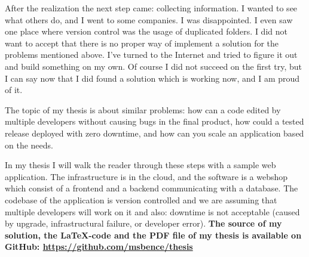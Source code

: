 After the realization the next step came: collecting information. I wanted to see what others do, and I went to some companies. I was disappointed. I even saw one place where version control was the usage of duplicated folders. I did not want to accept that there is no proper way of implement a solution for the problems mentioned above. I've turned to the Internet and tried to figure it out and build something on my own. Of course I did not succeed on the first try, but I can say now that I did found a solution which is working now, and I am proud of it.

The topic of my thesis is about similar problems: how can a code edited by multiple developers without causing bugs in the final product, how could a tested release deployed with zero downtime, and how can you scale an application based on the needs.

In my thesis I will walk the reader through these steps with a sample web application. The infrastructure is in the cloud, and the software is a webshop which consist of a frontend and a backend communicating with a database. The codebase of the application is version controlled and we are assuming that multiple developers will work on it and also: downtime is not acceptable (caused by upgrade, infrastructural failure, or developer error).
\newline
\newline
\textbf{The source of my solution, the \LaTeX-code and the PDF file of my thesis is available on GitHub: \url{https://github.com/msbence/thesis}}
\vfill
\selectthesislanguage

\setcounter{romanPage}{\value{page}}
